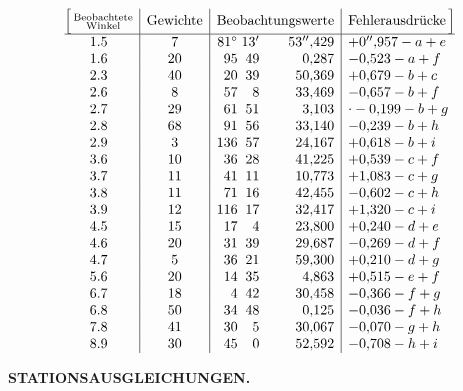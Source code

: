 \[
\begin{array}{@{}c|c|r@{\;}r@{\;}r|l@{}}
 \Bigl[\,\substack{\text{Beobachtete}\\\text{Winkel}}&
 \text{Gewichte}&\multicolumn{3}{c|}{\text{Beobachtungswerte}}&
 \multicolumn{1}{c@{}}{\text{Fehlerausdrücke}\,\Bigr]}\\
 \hline
 1.5&7&81^\circ&13'&53''{,}429&+0''{,}957-a+e\\
 1.6&20&95&49&0{,}287&-0{,}523-a+f\\
 2.3&40&20&39&50{,}369&+0{,}679-b+c\\
 2.6&8&57&8&33{,}469&-0{,}657-b+f\\
 2.7&29&61&51&3{,}103&\mathord{\raisebox{.55ex}{.}}-0{,}199-b+g\\
 2.8&68&91&56&33{,}140&-0{,}239-b+h\\
 2.9&3&136&57&24{,}167&+0{,}618-b+i\\
 3.6&10&36&28&41{,}225&+0{,}539-c+f\\
 3.7&11&41&11&10{,}773&+1{,}083-c+g\\
 3.8&11&71&16&42{,}455&-0{,}602-c+h\\
 3.9&12&116&17&32{,}417&+1{,}320-c+i\\
 4.5&15&17&4&23{,}800&+0{,}240-d+e\\
 4.6&20&31&39&29{,}687&-0{,}269-d+f\\
 4.7&5&36&21&59{,}300&+0{,}210-d+g\\
 5.6&20&14&35&4{,}863&+0{,}515-e+f\\
 6.7&18&4&42&30{,}458&-0{,}366-f+g\\
 6.8&50&34&48&0{,}125&-0{,}036-f+h\\
 7.8&41&30&5&30{,}067&-0{,}070-g+h\\
 8.9&30&45&0&52{,}592&-0{,}708-h+i
\end{array}
\]

\par\clearpage
\noindent\null\hfill{\small\textbf{STATIONSAUSGLEICHUNGEN.}}\hfill{}\par\medskip

